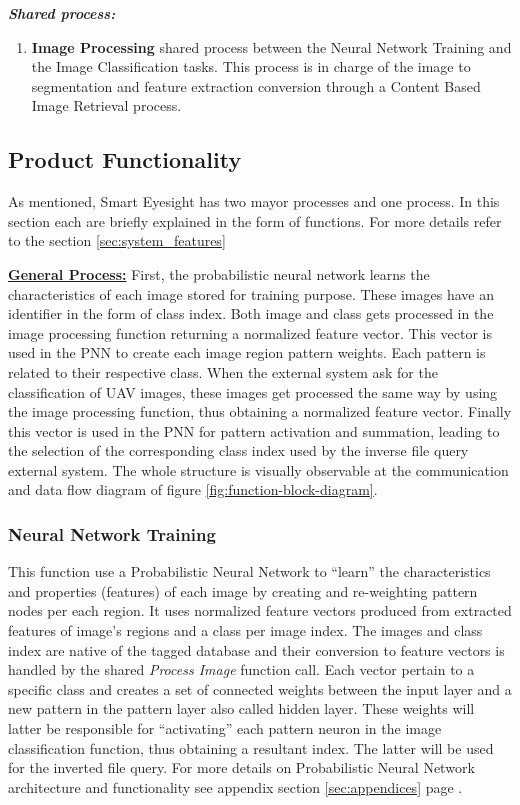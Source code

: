 \documentclass[12pt]{article}
\begin{document}
\textbf{\textit{Shared process:}}
\begin{enumerate}
\item \textbf{Image Processing} shared process between the Neural
  Network Training and the Image Classification tasks. This process is
  in charge of the image to segmentation and feature extraction
  conversion through a Content Based Image Retrieval process.
\end{enumerate}


\subsection{Product Functionality}
\label{sec:software_functions}
As mentioned, Smart Eyesight has two mayor processes and one
process. In this section each are briefly explained in the form of
functions. For more details refer to the section
\ref{sec:system_features}

\underline{\textbf{General Process:}} First, the probabilistic
neural network learns the characteristics of each image stored for
training purpose. These images have an identifier in the form of class
index. Both image and class gets processed in the image processing
function returning a normalized feature vector. This vector is used in
the PNN to create each image region pattern weights. Each pattern is
related to their respective class. When the external system ask for
the classification of UAV images, these images get processed the same
way by using the image processing function, thus obtaining a
normalized feature vector. Finally this vector is used in the PNN for
pattern activation and summation, leading to the selection of the
corresponding class index used by the inverse file query external
system. The whole structure is visually observable at the
communication and data flow diagram of figure
\ref{fig:function-block-diagram}.

\subsubsection{Neural Network Training}
\label{sec:NNT_function}
This function use a Probabilistic Neural Network to ``learn'' the
characteristics and properties (features) of each image by creating
and re-weighting pattern nodes per each region. It uses normalized
feature vectors produced from extracted features of image's regions
and a class per image index. The images and class index are native of
the tagged database and their conversion to feature vectors is handled
by the shared \textit{Process Image} function call. Each vector
pertain to a specific class and creates a set of connected weights
between the input layer and a new pattern in the pattern layer also
called hidden layer. These weights will latter be responsible for
``activating'' each pattern neuron in the image classification
function, thus obtaining a resultant index. The latter will be used
for the inverted file query. For more details on Probabilistic Neural
Network architecture and functionality see appendix section
\ref{sec:appendices} page \pageref{pnn_architecture}.
\end{document}
